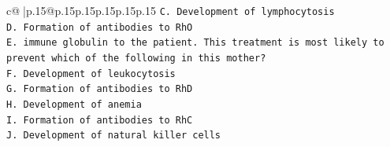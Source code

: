 \documentclass{article}
\begin{document}
{\begin{supertabular}{c@{$\;$}|p{.15\linewidth}@{}p{.15\linewidth}p{.15\linewidth}p{.15\linewidth}p{.15\linewidth}p{.15\linewidth}}
{{{\texttt{C. Development of lymphocytosis} \\
\texttt{D. Formation of antibodies to RhO} \\
\texttt{E. immune globulin to the patient. This treatment is most likely to prevent which of the following in this mother?} \\
\texttt{F. Development of leukocytosis} \\
\texttt{G. Formation of antibodies to RhD} \\
\texttt{H. Development of anemia} \\
\texttt{I. Formation of antibodies to RhC} \\
\texttt{J. Development of natural killer cells} \\
            }
        }
    }
     \\ \\


\end{supertabular}}
\end{document}
